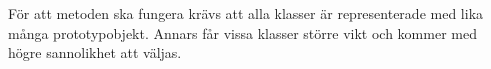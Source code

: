 \documentclass[../rapport_MVEX01-11-05]{subfiles}
\begin{document}
För att metoden ska fungera krävs att alla klasser är representerade med lika många prototypobjekt. Annars får vissa klasser större vikt och kommer med högre sannolikhet att väljas.


%

\end{document}
